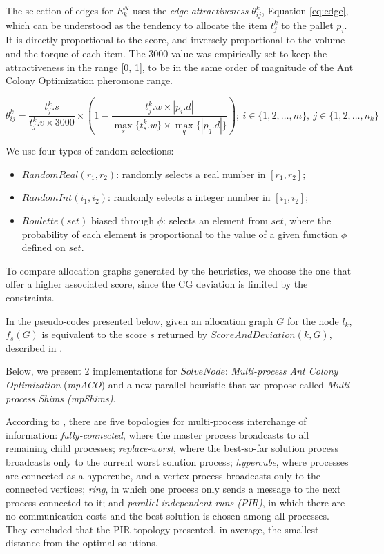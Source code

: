 \documentclass[preprint,authoryear]{elsarticle}
\begin{document}
The selection of edges for $E^N_k$\/ uses the {\it edge attractiveness}\/ $\theta^k_{ij}$, Equation \ref{eq:edge}, which can be understood as the tendency to allocate the item $t^k_j$\/ to the pallet $p_i$. It is directly proportional to the score, and inversely proportional to the volume and the torque of each item. The 3000 value was empirically set to keep the attractiveness in the range [0, 1], to be in the same order of magnitude of the Ant Colony Optimization pheromone range.

\begin{equation} \label{eq:edge}
	\theta^k_{ij}= \frac{t^k_j.s}{t^k_j.v \times 3000}\times(1-\frac{t^k_j.w\times|p_i.d|}{\max_s\{t^k_s.w\}\times\max_q\{|p_q.d|\}});\ i \in \{1,2,\ldots,m\},\ j \in \{1,2,\ldots,n_k\}
\end{equation} 


We use four types of random selections:
\begin{itemize}
	\item $RandomReal(r_1,r_2)$: randomly selects a real number in $[r_1,r_2]$;
	\item $RandomInt(i_1,i_2)$: randomly selects a integer number in $[i_1,i_2]$;
	\item $Roulette(set)$ biased through $\phi$: selects an element from $set$, where the probability of each element is proportional to the value of a given function $\phi$\/ defined on $set$.
\end{itemize}


To compare allocation graphs generated by the heuristics, we choose the one that offer a higher associated score, since the CG deviation is limited by the constraints.

In the pseudo-codes presented below, given an allocation graph $G$\/ for the node $l_k$, $f_s(G)$\/ is equivalent to the score $s$\/ returned by $ScoreAndDeviation(k,G) $, described in \cite{MesquitaSanches2023}.

Below, we present 2 implementations for $SolveNode$: {\it Multi-process Ant Colony Optimization}\/ ({\it mpACO})  and a new parallel heuristic that we propose called {\it Multi-process Shims (mpShims)}.

According to \cite[p.226]{manfrin2006}, there are five topologies for multi-process interchange of information: {\it fully-connected}, where the master process broadcasts to all remaining child processes; {\it replace-worst}, where the best-so-far solution process broadcasts only to the current worst solution process; {\it hypercube}, where processes are connected as a hypercube, and a vertex process broadcasts only to the connected vertices; {\it ring}, in which one process only sends a message to the next process connected to it; and {\it parallel independent runs (PIR)}, in which there are no communication costs and the best solution is chosen among all processes. They concluded that the PIR topology presented, in average, the smallest distance from the optimal solutions.
\end{document}
